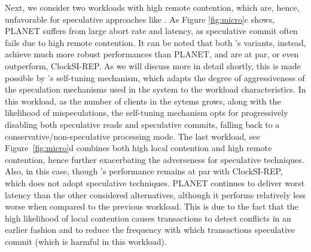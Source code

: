 
Next, we consider two workloads with high remote contention, which are, hence, unfavorable for speculative approaches like \specula. As Figure \ref{fig:micro}c shows, PLANET suffers from large abort rate and  latency, as speculative commit often fails due to high remote contention.
It can be noted that both \specula's variants, instead, achieve much more robust performances than PLANET,  and are at par, or even outperform, ClockSI-REP. As we will discuss more in detail shortly, this is made possible by \specula's self-tuning mechanism, which adapts the degree of aggressiveness of the speculation mechanisms used in the system to the workload characteristics. In this workload, as the number of clients in the sytems grows, along with the likelihood of mispeculations, the self-tuning mechanism opts for progressively disabling both speculative reads and speculative commits, falling back to a conservative/non-speculative processing mode. The last workload, see Figure~\ref{fig:micro}d combines both high local contention and high remote contention, hence further exacerbating the adverseness for speculative techniques. Also, in this case, though \specula's performance remains at par with ClockSI-REP, which does not adopt speculative techniques.  PLANET continues to deliver worst 
latency than the other considered alternatives, although it performs relatively less worse when compared to the previous workload. This is due to the fact that the high likelihood of  local contention causes transactions to detect conflicts in an earlier fashion and to reduce the frequency with which transactions speculative commit (which is harmful in this workload).


